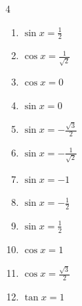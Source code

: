\begin{multicols}{4}
\begin{enumerate}
  \item $\displaystyle \sin{x}  = \frac{1}{2}$


  \item $\displaystyle \cos{x}  = \frac{1}{\sqrt{2}}$


  \item $\displaystyle \cos{x}  = 0$


  \item $\displaystyle \sin{x}  = 0$


  \item $\displaystyle \sin{x}  = -\frac{\sqrt{3}}{2}$


  \item $\displaystyle \sin{x}  = -\frac{1}{\sqrt{2}}$


  \item $\displaystyle \sin{x}  = -1$


  \item $\displaystyle \sin{x}  = -\frac{1}{2}$


  \item $\displaystyle \sin{x}  = \frac{1}{2}$


  \item $\displaystyle \cos{x}  = 1$


  \item $\displaystyle \cos{x}  = \frac{\sqrt{3}}{2}$


  \item $\displaystyle \tan{x}  = 1$


\end{enumerate}
\end{multicols}
